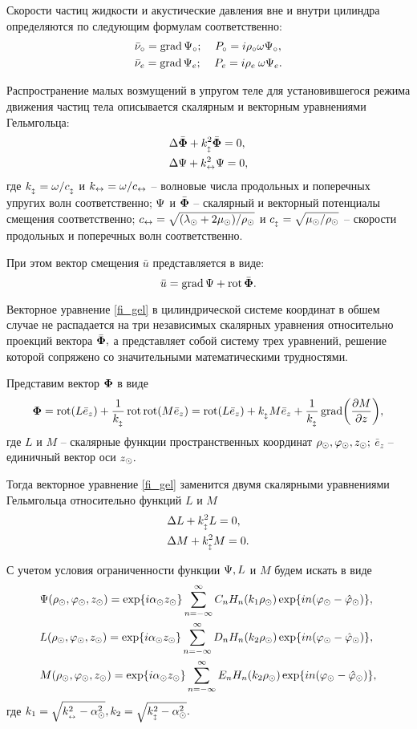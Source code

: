 Скорости частиц жидкости и акустические давления вне и внутри цилиндра определяются по следующим формулам соответственно:
\begin{align*}
&\bar{\nu}\c=\grad\P\c;\:\:\:\:\:P\c=i\r\c\omega\P\c,\\
&\bar{\nu}\en=\grad\P\en;\:\:\:\:\:P\en=i\r\en\:\omega\P\en.
\end{align*}

Распространение малых возмущений в упругом теле для установившегося режима движения частиц тела описывается скалярным и векторным уравнениями Гельмгольца:
\begin{align}
&\Lap\bar{\F}+k_{\popr}^2\bar{\F}=0,\\
&\Lap\P+k\prodol^2\P=0,\label{fi_gel}
\end{align}
где $k_{\popr}=\omega/c_{\popr}$ и $k\prodol=\omega/c\prodol$ -- волновые числа продольных и поперечных упругих волн соответственно; $\P$ и $\bar\F$ -- скалярный и векторный потенциалы смещения соответственно; $c\prodol=\sqrt{(\lambda\cyl+2\mu\cyl)/\r\cyl}$ и $c_{\popr}=\sqrt{\mu\cyl/\r\cyl}$ -- скорости продольных и поперечных волн соответственно.

При этом вектор смещения $\bar{u}$ представляется в виде:
\begin{equation}
\bar{u}=\grad\P+\rot\bar{\F}.
\end{equation}

Векторное уравнение \eqref{fi_gel} в цилиндрической системе координат в обшем случае не распадается на три независимых скалярных уравнения относительно проекций вектора $\bar{\F},$ а представляет собой систему трех уравнений, решение которой сопряжено со значительными математическими трудностями.

Представим вектор $\F$ в виде
$$\F=\rot(L\bar{e}_z)+\frac1{k_{\popr}}\rot\rot(M\bar{e}_z)=\rot(L\bar{e}_z)+k_{\popr} M\bar{e}_z+\frac1{k_{\popr}}\grad\biggl(\frac{\partial M}{\partial z}\biggr),$$
где $L$ и $M$ -- скалярные функции пространственных координат $\r\cyl, \varphi\cyl, z\cyl;$
\newline
$\bar{e}_z$ -- единичный вектор оси $z\cyl.$

Тогда векторное уравнение \eqref{fi_gel} заменится двумя скалярными уравнениями Гельмгольца относительно функций $L$ и $M$
\begin{align*}
&\Lap L+k_{\popr}^2L=0,\\
&\Lap M+k_{\popr}^2M=0.
\end{align*}

С учетом условия ограниченности функции $\P, L$ и $M$ будем искать в виде
\begin{align}
&\P(\r\cyl, \f\cyl, z\cyl)= \exp\{i\alpha\cyl z\cyl\}\sum_{n=-\infty}^{\infty}C_nH_n(k_1 \r\cyl)\exp\{in(\f\cyl-\hat\f\cyl)\},\label{pazloj_psi}\\
&L(\r\cyl, \f\cyl, z\cyl)= \exp\{i\alpha\cyl z\cyl\}\sum_{n=-\infty}^{\infty}D_nH_n(k_2 \r\cyl)\exp\{in(\f\cyl-\hat\f\cyl)\},\label{pazloj_l}\\
&M(\r\cyl, \f\cyl, z\cyl)= \exp\{i\alpha\cyl z\cyl\}\sum_{n=-\infty}^{\infty}E_nH_n(k_2 \r\cyl)\exp\{in(\f\cyl-\hat\f\cyl)\},\label{pazloj_m}
\end{align}
где $k_1=\sqrt{k_{\prodol}^2-\alpha^2\cyl}, k_2=\sqrt{k_{\popr}^2-\alpha^2\cyl}.$

